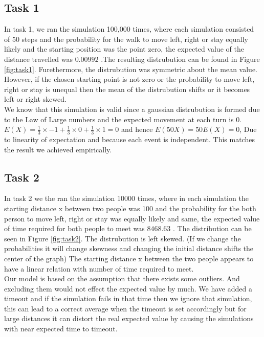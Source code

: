 \documentclass[a4paper, 11pt]{book} %
\begin{document}
\subsection*{Task 1}

In task 1, we ran the simulation 100,000 times, where each simulation consisted of 50 steps and the probability for the walk to move left, right or stay equally likely and the starting position was the point zero,  the expected value of the distance travelled was \(0.00992\) .The resulting distrubution can be found in Figure \ref{fig:task1}.
Furethermore, the distrubution was symmetric about the mean value. However, if the chosen starting point is not zero or the probability to move left, right or stay is unequal then the mean of the distrubution shifts or it becomes left or right skewed.
\\
We know that this simulation is valid since a gaussian distrubution is formed due to the Law of Large numbers and the expected movement at each turn is 0. \(E(X)= \frac{1}{3} \times-1 + \frac{1}{3} \times 0 + \frac{1}{3} \times 1 =0\) and hence \(E(50X)= 50 E(X) =0\), Due to linearity of expectation and because each event is independent. This matches the result we achieved empirically.
\subsection*{Task 2}

In task 2 we the ran the simulation 10000 times, where in each simulation the starting distance x between two people was 100 and the probability for the both person to move left, right or stay was equally likely and same, the expected value of time required for both people to meet was \(8468.63\) . The distribution can be seen in Figure \ref{fig:task2}.
The distrubution is left skewed. (If we change the probabilities it will change skewness and changing the initial distance shifts the center of the graph)  The starting distance x between the two people appears to have a  linear relation with number of time required to meet. \\
Our model is based on the assumption that there exists some outliers. And excluding them would not effect the expected value by much. We have added a timeout and if the simulation fails in that time then we ignore that simulation, this can lead to a correct average when the timeout is set accordingly but for large distances it can distort the real expected value by causing the simulations with near expected time to timeout.
\end{document}
